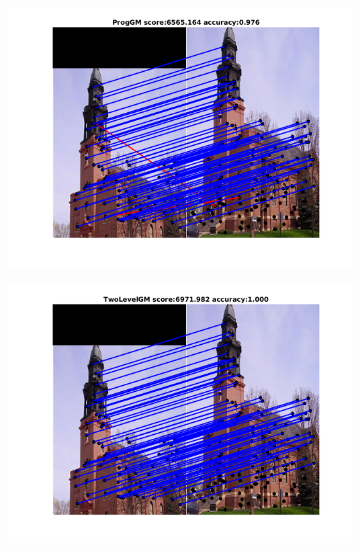\documentclass[
	fontsize=12pt,
	paper=a4,
	twoside=false,
	numbers=noenddot,
	plainheadsepline,
	toc=listof,
	toc=bibliography
]{scrartcl}
\begin{document}
\begin{figure}[h]
	\begin{subfigure}[b]{0.33\textwidth}
		\centering
		\includegraphics[scale=0.25]{"fig_ver2608/RealImages/ImgTrafo/anchor_descr/using_cpd_afftrafo/fi_2_ProgGM"} 
	\end{subfigure}%
	\begin{subfigure}[b]{0.33\textwidth}
		\centering
		\includegraphics[scale=0.25]{"fig_ver2608/RealImages/ImgTrafo/anchor_descr/using_cpd_afftrafo/fi_2_TwoLevelGM"} 
	\end{subfigure} 
	\begin{subfigure}[b]{0.33\textwidth}
		\centering

\end{subfigure}
\end{figure}
\end{document}
